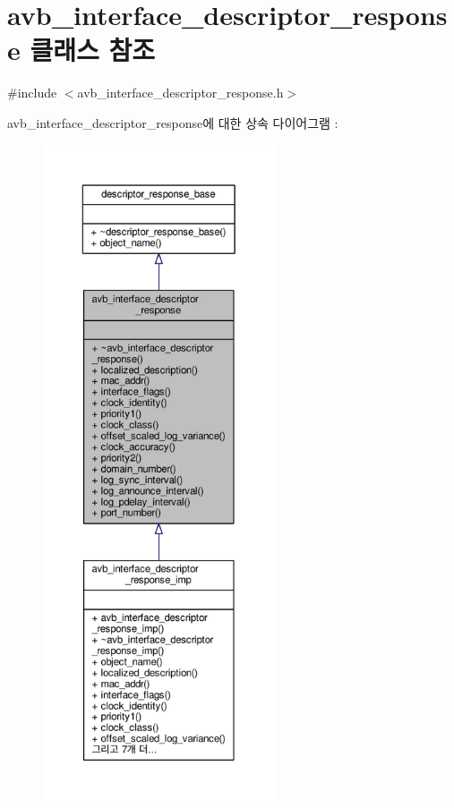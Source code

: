 \hypertarget{classavdecc__lib_1_1avb__interface__descriptor__response}{}\section{avb\+\_\+interface\+\_\+descriptor\+\_\+response 클래스 참조}
\label{classavdecc__lib_1_1avb__interface__descriptor__response}


{\ttfamily \#include $<$avb\+\_\+interface\+\_\+descriptor\+\_\+response.\+h$>$}



avb\+\_\+interface\+\_\+descriptor\+\_\+response에 대한 상속 다이어그램 \+: 
\nopagebreak
\begin{figure}[H]
\begin{center}
\leavevmode
\includegraphics[height=550pt]{classavdecc__lib_1_1avb__interface__descriptor__response__inherit__graph}
\end{center}
\end{figure}


